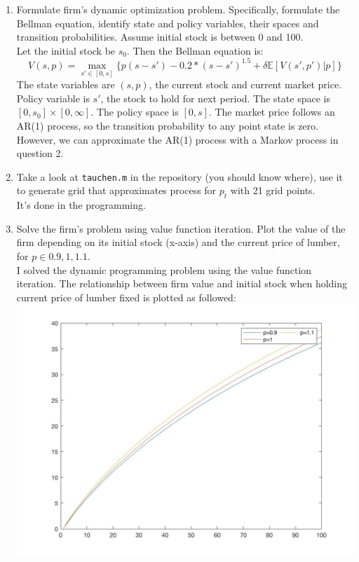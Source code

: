 \documentclass[11pt]{article}
\begin{document}
\begin{enumerate}
\item Formulate firm's dynamic optimization problem. Specifically, formulate the Bellman equation, identify state and policy variables, their spaces and transition probabilities. Assume initial stock is between 0 and 100.\\[1em]
Let the initial stock be $s_0$. Then the Bellman equation is:
$$ 
V(s,p)= \max_{s' \in [0,s]} \{p(s-s')- 0.2*(s-s')^{1.5}+\delta  \mathbb{E}[V(s', p')|p]\}
$$
The state variables are $(s,p)$, the current stock and current market price. Policy variable is $s'$, the stock to hold for next period. The state space is $[0,s_0]\times [0, \infty]$. The policy space is $[0,s]$. The market price follows an AR(1) process, so the transition probability to any point state is zero. However, we can approximate the AR(1) process with a Markov process in question 2. 


\item Take a look at {\tt tauchen.m} in the repository (you should know where), use it to generate grid that approximates process for $p_t$ with 21 grid points. \\[1em]

It's done in the programming.

\item Solve the firm's problem using value function iteration. Plot the value of the firm depending on its initial stock (x-axis) and the current price of lumber, for $p \in{0.9, 1, 1.1}$.\\[1em]

I solved the dynamic programming problem using the value function iteration. The relationship between firm value and initial stock when holding current price of lumber fixed is plotted as followed: \\
    \includegraphics[scale=0.2]{Vs0.jpg}



\end{enumerate}
\end{document}
